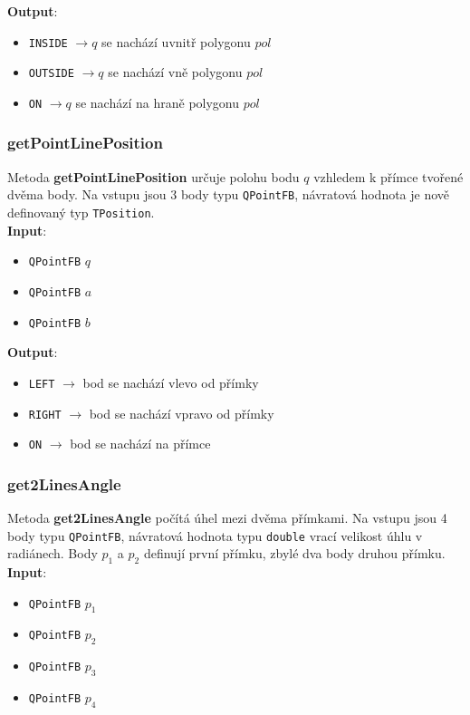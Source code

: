 \documentclass[a4paper, 12pt]{article}
\begin{document}
\textbf{Output}:
\begin{itemize}
\item \texttt{INSIDE} $\rightarrow q$ se nachází uvnitř polygonu $pol$
\item \texttt{OUTSIDE} $\rightarrow q$ se nachází vně polygonu $pol$
\item \texttt{ON} $\rightarrow q$ se nachází na hraně polygonu $pol$
\end{itemize}

\subsubsection*{getPointLinePosition}
Metoda \textbf{getPointLinePosition} určuje polohu bodu $q$ vzhledem k přímce tvořené dvěma body. Na vstupu jsou 3 body typu \texttt{QPointFB}, návratová hodnota je nově definovaný typ \texttt{TPosition}.\\

\textbf{Input}:
\begin{itemize}
\item \texttt{QPointFB} $q$
\item \texttt{QPointFB} $a$
\item \texttt{QPointFB} $b$
\end{itemize}

\textbf{Output}:
\begin{itemize}
\item \texttt{LEFT} $\rightarrow$ bod se nachází vlevo od přímky
\item \texttt{RIGHT} $\rightarrow$ bod se nachází vpravo od přímky
\item \texttt{ON} $\rightarrow$ bod se nachází na přímce
\end{itemize}

\subsubsection*{get2LinesAngle}
Metoda \textbf{get2LinesAngle} počítá úhel mezi dvěma přímkami. Na vstupu jsou 4 body typu \texttt{QPointFB}, návratová hodnota typu \texttt{double} vrací velikost úhlu v radiánech. Body $p_1$ a $p_2$ definují první přímku, zbylé dva body druhou přímku.\\

\textbf{Input}:
\begin{itemize}
\item \texttt{QPointFB} $p_1$ 
\item \texttt{QPointFB} $p_2$ 
\item \texttt{QPointFB} $p_3$
\item \texttt{QPointFB} $p_4$
\end{itemize}
\end{document}
